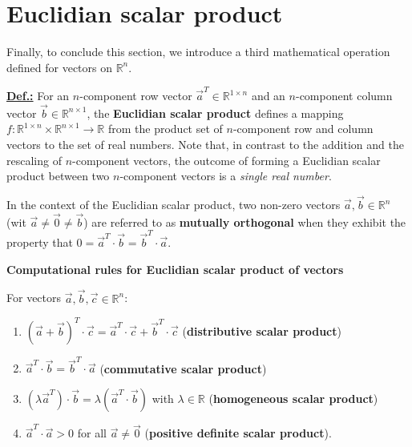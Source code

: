 \section[Euclidian scalar product]%
{Euclidian scalar product}
Finally, to conclude this section, we introduce a third mathematical operation defined for vectors on $\mathbb{R}^{n}$.

\medskip
\noindent
\underline{\bf Def.:} For an $n$-component row vector $\vec{a}^{T} 
\in \mathbb{R}^{1 \times n}$ and an $n$-component column vector 
$\vec{b} \in \mathbb{R}^{n \times 1}$, the {\bf Euclidian scalar 
product}
%
\be
{}
\ee
%
defines a mapping $f: \mathbb{R}^{1 \times n} \times \mathbb{R}^{n 
\times 1} \rightarrow \mathbb{R}$ from the product set of 
$n$-component row and column vectors to the set of real numbers. 
Note that, in contrast to the addition and the rescaling of 
$n$-component vectors, the outcome of forming a Euclidian scalar 
product between two $n$-component vectors is a \emph{single real 
number}.

\medskip
\noindent
In the context of the Euclidian scalar product, two non-zero 
vectors $\vec{a}, \vec{b} \in {\mathbb R}^{n}$ (wit $\vec{a}
\neq \vec{0} \neq \vec{b}$) are referred to as {\bf mutually 
orthogonal} when they exhibit the property that $0 = 
\vec{a}^{T}\cdot\vec{b} = \vec{b}^{T}\cdot\vec{a}$.

\medskip
\noindent
{\bf Computational rules for Euclidian scalar product of 
vectors}

\noindent
For vectors $\vec{a}, \vec{b}, \vec{c} \in {\mathbb R}^{n}$:

\begin{enumerate}
	\item $(\vec{a}+\vec{b})^{T}\cdot\vec{c}
	= \vec{a}^{T}\cdot\vec{c}+\vec{b}^{T}\cdot\vec{c}$
	\hfill ({\bf distributive scalar product})
	\item $\vec{a}^{T}\cdot\vec{b} = \vec{b}^{T}\cdot\vec{a}$
	\hfill ({\bf commutative scalar product})
	\item $(\lambda\vec{a}^{T})\cdot\vec{b} =
	\lambda(\vec{a}^{T}\cdot\vec{b})$ with $\lambda \in {\mathbb R}$
	\hfill ({\bf homogeneous scalar product})
	\item $\vec{a}^{T}\cdot\vec{a} > 0$ for all $\vec{a}
	\neq \vec{0}$ \hfill ({\bf positive definite scalar product}).
\end{enumerate}

